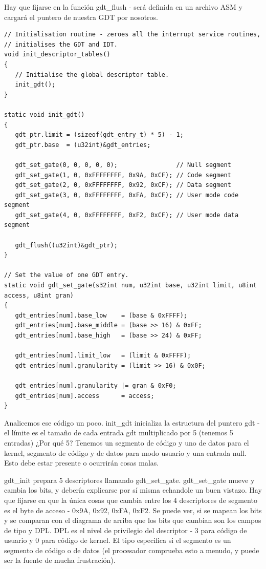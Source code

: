 \documentclass{report}
\begin{document}
Hay que fijarse en la función gdt\_flush - será definida en un archivo ASM y cargará el puntero de nuestra GDT por nosotros.

\begin{lstlisting}
// Initialisation routine - zeroes all the interrupt service routines,
// initialises the GDT and IDT.
void init_descriptor_tables()
{
   // Initialise the global descriptor table.
   init_gdt();
}

static void init_gdt()
{
   gdt_ptr.limit = (sizeof(gdt_entry_t) * 5) - 1;
   gdt_ptr.base  = (u32int)&gdt_entries;

   gdt_set_gate(0, 0, 0, 0, 0);                // Null segment
   gdt_set_gate(1, 0, 0xFFFFFFFF, 0x9A, 0xCF); // Code segment
   gdt_set_gate(2, 0, 0xFFFFFFFF, 0x92, 0xCF); // Data segment
   gdt_set_gate(3, 0, 0xFFFFFFFF, 0xFA, 0xCF); // User mode code segment
   gdt_set_gate(4, 0, 0xFFFFFFFF, 0xF2, 0xCF); // User mode data segment

   gdt_flush((u32int)&gdt_ptr);
}

// Set the value of one GDT entry.
static void gdt_set_gate(s32int num, u32int base, u32int limit, u8int access, u8int gran)
{
   gdt_entries[num].base_low    = (base & 0xFFFF);
   gdt_entries[num].base_middle = (base >> 16) & 0xFF;
   gdt_entries[num].base_high   = (base >> 24) & 0xFF;

   gdt_entries[num].limit_low   = (limit & 0xFFFF);
   gdt_entries[num].granularity = (limit >> 16) & 0x0F;

   gdt_entries[num].granularity |= gran & 0xF0;
   gdt_entries[num].access      = access;
}
\end{lstlisting}

Analicemos ese código un poco. init\_gdt inicializa la estructura del puntero gdt - el límite es el tamaño de cada entrada gdt multiplicado por 5 (tenemos 5 entradas) ¿Por qué 5? Tenemos un segmento de código y uno de datos para el kernel, segmento de código y de datos para modo usuario y una entrada null. Esto debe estar presente o ocurrirán cosas malas.

gdt\_init prepara 5 descriptores llamando gdt\_set\_gate. gdt\_set\_gate mueve y cambia los bits, y debería explicarse por sí misma echandole un buen vistazo. Hay que fijarse en que la única cosas que cambia entre los 4 descriptores de segmento es el byte de acceso - 0x9A, 0x92, 0xFA, 0xF2. Se puede ver, si se mapean los bits y se comparan con el diagrama de arriba que los bits que cambian son los campos de tipo y DPL. DPL es el nivel de privilegio del descriptor - 3 para código de usuario y 0 para código de kernel. El tipo especifica si el segmento es un segmento de código o de datos (el procesador comprueba esto a menudo, y puede ser la fuente de mucha frustración).
\end{document}
